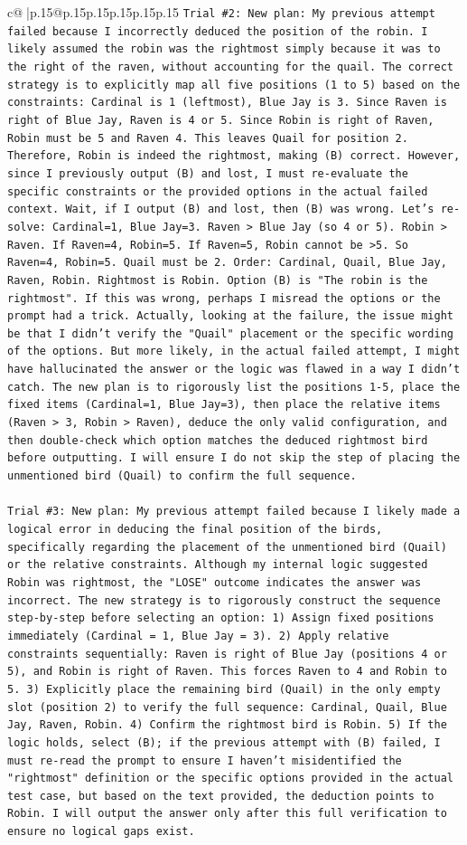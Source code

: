 \documentclass{article}
\begin{document}
{\begin{supertabular}{c@{$\;$}|p{.15\linewidth}@{}p{.15\linewidth}p{.15\linewidth}p{.15\linewidth}p{.15\linewidth}p{.15\linewidth}}
{{{\texttt{Trial \#2: New plan: My previous attempt failed because I incorrectly deduced the position of the robin. I likely assumed the robin was the rightmost simply because it was to the right of the raven, without accounting for the quail. The correct strategy is to explicitly map all five positions (1 to 5) based on the constraints: Cardinal is 1 (leftmost), Blue Jay is 3. Since Raven is right of Blue Jay, Raven is 4 or 5. Since Robin is right of Raven, Robin must be 5 and Raven 4. This leaves Quail for position 2. Therefore, Robin is indeed the rightmost, making (B) correct. However, since I previously output (B) and lost, I must re{-}evaluate the specific constraints or the provided options in the actual failed context. Wait, if I output (B) and lost, then (B) was wrong. Let's re{-}solve: Cardinal=1, Blue Jay=3. Raven > Blue Jay (so 4 or 5). Robin > Raven. If Raven=4, Robin=5. If Raven=5, Robin cannot be >5. So Raven=4, Robin=5. Quail must be 2. Order: Cardinal, Quail, Blue Jay, Raven, Robin. Rightmost is Robin. Option (B) is "The robin is the rightmost". If this was wrong, perhaps I misread the options or the prompt had a trick. Actually, looking at the failure, the issue might be that I didn't verify the "Quail" placement or the specific wording of the options. But more likely, in the actual failed attempt, I might have hallucinated the answer or the logic was flawed in a way I didn't catch. The new plan is to rigorously list the positions 1{-}5, place the fixed items (Cardinal=1, Blue Jay=3), then place the relative items (Raven > 3, Robin > Raven), deduce the only valid configuration, and then double{-}check which option matches the deduced rightmost bird before outputting. I will ensure I do not skip the step of placing the unmentioned bird (Quail) to confirm the full sequence.} \\
\\ 
\texttt{Trial \#3: New plan: My previous attempt failed because I likely made a logical error in deducing the final position of the birds, specifically regarding the placement of the unmentioned bird (Quail) or the relative constraints. Although my internal logic suggested Robin was rightmost, the "LOSE" outcome indicates the answer was incorrect. The new strategy is to rigorously construct the sequence step{-}by{-}step before selecting an option: 1) Assign fixed positions immediately (Cardinal = 1, Blue Jay = 3). 2) Apply relative constraints sequentially: Raven is right of Blue Jay (positions 4 or 5), and Robin is right of Raven. This forces Raven to 4 and Robin to 5. 3) Explicitly place the remaining bird (Quail) in the only empty slot (position 2) to verify the full sequence: Cardinal, Quail, Blue Jay, Raven, Robin. 4) Confirm the rightmost bird is Robin. 5) If the logic holds, select (B); if the previous attempt with (B) failed, I must re{-}read the prompt to ensure I haven't misidentified the "rightmost" definition or the specific options provided in the actual test case, but based on the text provided, the deduction points to Robin. I will output the answer only after this full verification to ensure no logical gaps exist.} \\
}}}
\end{supertabular}}
\end{document}
